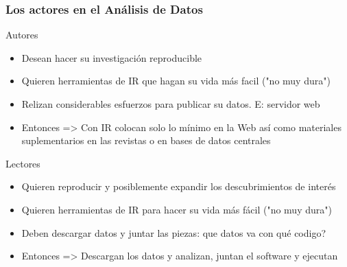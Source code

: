\documentclass[sans serif,9pt,xcolor=dvipsnames]{beamer}%
\begin{document}
\begin{frame}
\frametitle{Los actores en el Análisis de Datos}
\justifying
\begin{block}{Autores} 
\begin{itemize}
  \item Desean hacer su investigación reproducible
  \item Quieren herramientas de IR que hagan su vida más facil ("no muy dura")
  \item Relizan considerables esfuerzos para publicar su datos. E: servidor web
  \item Entonces => Con IR colocan solo lo mínimo en la Web así como materiales suplementarios en las revistas o en bases de datos centrales
\end{itemize}
\end{block}
\begin{block}{Lectores} 
\begin{itemize}
  \item Quieren reproducir y posiblemente expandir los descubrimientos de interés
  \item Quieren herramientas de IR para hacer su vida más fácil ("no muy dura")
  \item Deben descargar datos y juntar las piezas: que datos va con qué codigo?
  \item Entonces => Descargan los datos y analizan, juntan el software y ejecutan
\end{itemize}
\end{block}
\end{frame}
\end{document}
